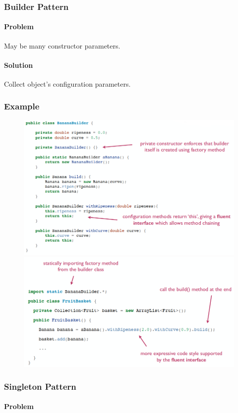 \documentclass[twocolumn,english]{article}
\begin{document}
\subsubsection{Builder Pattern}

\paragraph{Problem}

May be many constructor parameters.

\paragraph{Solution}

Collect object's configuration parameters.

\subsubsection*{Example}

\begin{figure}[H]
\centering{}\includegraphics[width=0.55\columnwidth]{img/builder}\includegraphics[width=0.45\columnwidth]{img/builder2}
\end{figure}

\subsubsection{Singleton Pattern}

\paragraph{Problem}
\end{document}
